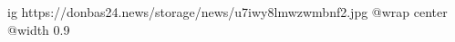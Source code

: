  
 
 
 
 

\ifcmt
  ig https://donbas24.news/storage/news/u7iwy8lmwzwmbnf2.jpg
  @wrap center
  @width 0.9
\fi
